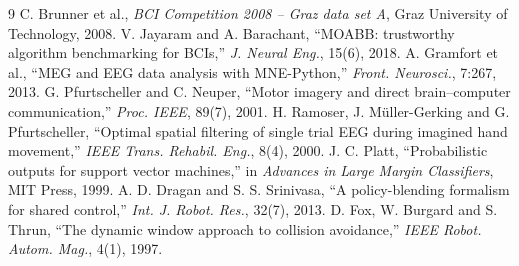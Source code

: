 \documentclass[11pt,a4paper]{article}
\begin{document}
\begin{thebibliography}{9}\small
{} C. Brunner et al., \emph{BCI Competition 2008 -- Graz data set A}, Graz University of Technology, 2008.
 V. Jayaram and A. Barachant, ``MOABB: trustworthy algorithm benchmarking for BCIs,'' \emph{J. Neural Eng.}, 15(6), 2018.
 A. Gramfort et al., ``MEG and EEG data analysis with MNE-Python,'' \emph{Front. Neurosci.}, 7:267, 2013.
 G. Pfurtscheller and C. Neuper, ``Motor imagery and direct brain--computer communication,'' \emph{Proc. IEEE}, 89(7), 2001.
 H. Ramoser, J. M\"uller-Gerking and G. Pfurtscheller, ``Optimal spatial filtering of single trial EEG during imagined hand movement,'' \emph{IEEE Trans. Rehabil. Eng.}, 8(4), 2000.
 J. C. Platt, ``Probabilistic outputs for support vector machines,'' in \emph{Advances in Large Margin Classifiers}, MIT Press, 1999.
 A. D. Dragan and S. S. Srinivasa, ``A policy-blending formalism for shared control,'' \emph{Int. J. Robot. Res.}, 32(7), 2013.
 D. Fox, W. Burgard and S. Thrun, ``The dynamic window approach to collision avoidance,'' \emph{IEEE Robot. Autom. Mag.}, 4(1), 1997.
\end{thebibliography}
\end{document}
